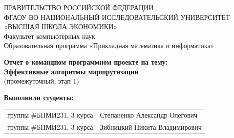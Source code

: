 \begin{titlepage}
\newpage

{
\begin{center}
ПРАВИТЕЛЬСТВО РОССИЙСКОЙ ФЕДЕРАЦИИ\\
ФГАОУ ВО НАЦИОНАЛЬНЫЙ ИССЛЕДОВАТЕЛЬСКИЙ УНИВЕРСИТЕТ\\
«ВЫСШАЯ ШКОЛА ЭКОНОМИКИ»
\\
\bigskip
Факультет компьютерных наук\\
Образовательная программа «Прикладная математика и информатика»
\end{center}
}

\vspace{2em}
\vspace{4em}

\begin{center}
{\bf Отчет о командном программном проекте на тему:}\\
{\bf Эффективные алгоритмы маршрутизации}\\
(промежуточный, этап 1)
\end{center}

\vspace{2em}

{\bf Выполнили студенты: \vspace{2mm}}

{
\begin{tabular}{l@{\hskip 1.5cm}l}
группы \#БПМИ231, 3 курса & Степаненко Александр Олегович \\
группы \#БПМИ231, 3 курса & Зибницкий Никита Владимирович \\
\end{tabular}}



\end{titlepage}
